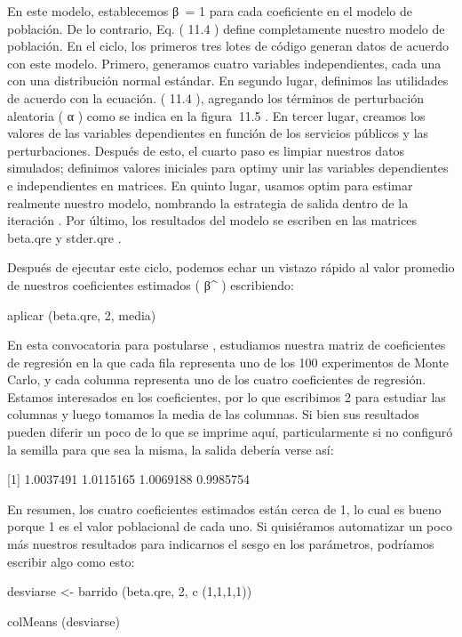 \documentclass[
]{book}
\begin{document}
En este modelo, establecemos β  = 1 para cada coeficiente en el modelo de población. De lo contrario, Eq. ( 11.4 ) define completamente nuestro modelo de población. En el ciclo, los primeros tres lotes de código generan datos de acuerdo con este modelo. Primero, generamos cuatro variables independientes, cada una con una distribución normal estándar. En segundo lugar, definimos las utilidades de acuerdo con la ecuación. ( 11.4 ), agregando los términos de perturbación aleatoria ( α ) como se indica en la figura  11.5 . En tercer lugar, creamos los valores de las variables dependientes en función de los servicios públicos y las perturbaciones. Después de esto, el cuarto paso es limpiar nuestros datos simulados; definimos valores iniciales para optimy unir las variables dependientes e independientes en matrices. En quinto lugar, usamos optim para estimar realmente nuestro modelo, nombrando la estrategia de salida dentro de la iteración . Por último, los resultados del modelo se escriben en las matrices beta.qre y stder.qre .

Después de ejecutar este ciclo, podemos echar un vistazo rápido al valor promedio de nuestros coeficientes estimados ( β\^{} ) escribiendo:

aplicar (beta.qre, 2, media)

En esta convocatoria para postularse , estudiamos nuestra matriz de coeficientes de regresión en la que cada fila representa uno de los 100 experimentos de Monte Carlo, y cada columna representa uno de los cuatro coeficientes de regresión. Estamos interesados \hspace{0pt}\hspace{0pt}en los coeficientes, por lo que escribimos 2 para estudiar las columnas y luego tomamos la media de las columnas. Si bien sus resultados pueden diferir un poco de lo que se imprime aquí, particularmente si no configuró la semilla para que sea la misma, la salida debería verse así:

{[}1{]} 1.0037491 1.0115165 1.0069188 0.9985754

En resumen, los cuatro coeficientes estimados están cerca de 1, lo cual es bueno porque 1 es el valor poblacional de cada uno. Si quisiéramos automatizar un poco más nuestros resultados para indicarnos el sesgo en los parámetros, podríamos escribir algo como esto:

desviarse \textless- barrido (beta.qre, 2, c (1,1,1,1))

colMeans (desviarse)
\end{document}
